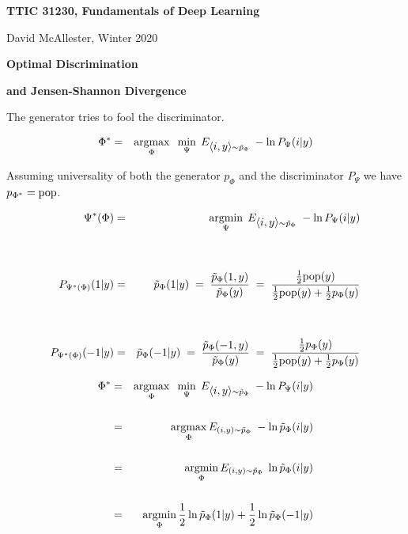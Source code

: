 





{\Huge

  \centerline{\bf TTIC 31230, Fundamentals of Deep Learning}
  \bigskip
  \centerline{David McAllester, Winter 2020}
  \vfill
  \centerline{\bf Optimal Discrimination}
  \vfill
  \centerline{\bf and Jensen-Shannon Divergence}
\vfill
\vfill




The generator tries to fool the discriminator.

\vfill
\begin{eqnarray*}
\Phi^* & = & \operatorname*{argmax}_\Phi\;\;\min_\Psi\;E_{{\mbox{$\langle i,y\rangle$}} \sim \tilde{p}_\Phi}\;-\ln P_\Psi(i|y)
\end{eqnarray*}

\vfill
Assuming universality of both the generator $p_\Phi$ and the discriminator $P_\Psi$ we have {\color{red} $p_{\Phi^*} = \mathrm{pop}$}.



\begin{eqnarray*}
  \Psi^*(\Phi) & = & \operatorname*{argmin}_\Psi\;E_{{\mbox{$\langle i,y\rangle$}} \sim \tilde{p}_\Phi}\;-\ln P_\Psi(i|y) \\
  \\
  \\
  P_{\Psi^*(\Phi)}(1|y)  & = & \tilde{p}_\Phi(1|y) \;=\;  \frac{\tilde{p}_\Phi(1,y)}{\tilde{p}_\Phi(y)} \;=\; \frac{\frac{1}{2}\mathrm{pop}(y)}{\frac{1}{2}\mathrm{pop}(y) + \frac{1}{2}p_\Phi(y)} \\
  \\
  \\
  P_{\Psi^*(\Phi)}(-1|y)  & = & \tilde{p}_\Phi(-1|y) \;=\; \frac{\tilde{p}_\Phi(-1,y)}{\tilde{p}_\Phi(y)} \;=\; \frac{\frac{1}{2}p_\Phi(y)}{\frac{1}{2}\mathrm{pop}(y) + \frac{1}{2}p_\Phi(y)}
\end{eqnarray*}



\begin{eqnarray*}
  \Phi^* & = & \operatorname*{argmax}_\Phi\;\;\min_\Psi\;E_{{\mbox{$\langle i,y\rangle$}} \sim \tilde{p}_\Phi}\;-\ln P_\Psi(i|y) \\
  \\
  & = & \operatorname*{argmax}_\Phi E_{(i,y) \sim  \tilde{p}_\Phi}\;- \ln \tilde{p}_\Phi(i|y) \\
  \\
  & = & \operatorname*{argmin}_\Phi E_{(i,y) \sim  \tilde{p}_\Phi}\;\ln \tilde{p}_\Phi(i|y) \\
  \\
  & = & \operatorname*{argmin}_\Phi \frac{1}{2}\ln \tilde{p}_\Phi(1|y) + \frac{1}{2}\ln \tilde{p}_\Phi(-1|y)
\end{eqnarray*}

}
